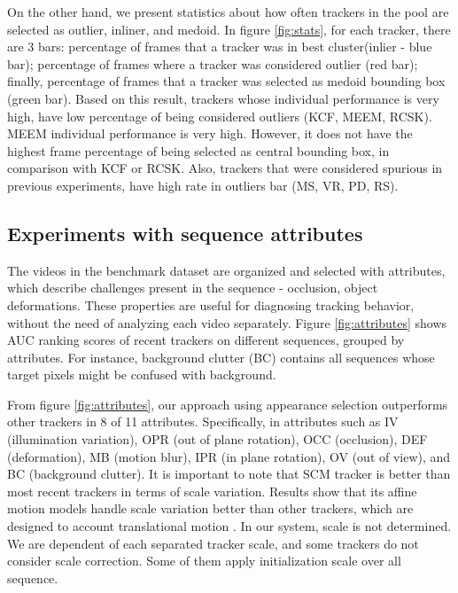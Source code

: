 On the other hand, we present statistics about how often trackers in the pool
are selected as outlier, inliner, and medoid.
In figure
\ref{fig:stats}, for each tracker, there are 3 bars: percentage of frames that a
tracker was in best cluster(inlier - blue bar); percentage of frames where a
tracker was considered outlier (red bar); finally, percentage of frames that a
tracker was selected as medoid bounding box (green bar). Based on this result,
trackers whose individual performance is very high, have low percentage of being
considered outliers (KCF, MEEM, RCSK). MEEM individual performance is very high.
However, it does not have the highest frame percentage of being selected as
central bounding box, in comparison with KCF or RCSK. Also, trackers that were
considered spurious in previous experiments, have high rate in outliers bar
(MS, VR, PD, RS). 

\subsection{Experiments with sequence attributes}

The videos in the benchmark dataset are organized and selected with attributes,
which describe challenges present in the sequence - \eg occlusion, object
deformations. These properties are useful for diagnosing tracking behavior,
without the need of analyzing each video separately. Figure \ref{fig:attributes}
shows AUC ranking scores of recent trackers on different sequences, grouped by
attributes. For instance, background clutter (BC) contains all sequences whose
target pixels might be confused with background.

From figure \ref{fig:attributes}, our approach using appearance selection
outperforms other trackers in 8 of 11 attributes. Specifically, in attributes
such as IV (illumination variation), OPR (out of plane rotation), OCC
(occlusion), DEF (deformation), MB (motion blur), IPR (in plane rotation),
OV (out of view), and BC (background clutter). It is important to note that SCM
tracker is better than most recent trackers in terms of scale variation.
Results show that its affine motion models handle scale
variation better than other trackers, which are designed to account
translational motion \cite{Wu2013}. In our system, scale is not determined. We are
dependent of each separated tracker scale, and some trackers do not consider
scale correction. Some of them apply initialization scale over all sequence.
